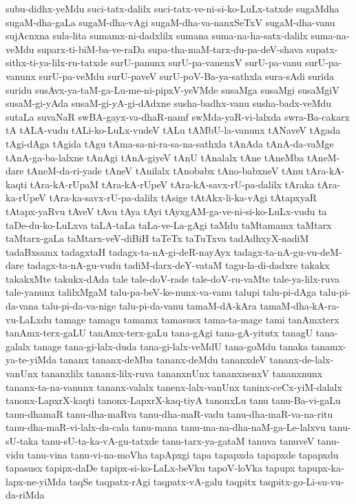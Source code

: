 {subu-didhx-yeMdu
suci-tatx-dalilx
suci-tatx-ve-ni-si-ko-LuLx-tatxde
sugaMdha
sugaM-dha-gaLa
sugaM-dha-vAgi
sugaM-dha-va-nanxSeTxV
sugaM-dha-vanu
sujAcnxna
sula-lita
sumamx-ni-dadxlilx
sumana
suma-na-ha-satx-dalilx
suma-na-veMdu
suparx-ti-biM-ba-ve-raDa
supa-tha-maM-tarx-du-pa-deV-shava
supatx-sithx-ti-ya-lilx-ru-tatxde
surU-panunx
surU-pa-vanenxV
surU-pa-vanu
surU-pa-vanunx
surU-pa-veMdu
surU-paveV
surU-poV-Ba-ya-sathxla
sura-sAdi
surida
suridu
susAvx-ya-taM-ga-Lu-me-ni-pipxV-yeVMde
susaMga
susaMgi
susaMgiV
susaM-gi-yAda
susaM-gi-yA-gi-dAdxne
susha-badhx-vanu
susha-badx-veMdu
sutaLa
suvaNaR
swBA-gayx-va-dhaR-namf
swMda-yaR-vi-lalxda
swra-Ba-cakarx
tA
tALA-vudu
tALi-ko-LuLx-vudeV
tALu
tAMbU-la-vanunx
tANaveV
tAgada
tAgi-dAga
tAgida
tAgu
tAma-sa-ni-ra-sa-na-sathxla
tAnAda
tAnA-da-vaMge
tAnA-ga-ba-lalxne
tAnAgi
tAnA-giyeV
tAnU
tAnalalx
tAne
tAneMba
tAneM-dare
tAneM-da-ri-yade
tAneV
tAnilalx
tAnobabx
tAno-babxneV
tAnu
tAra-kA-kaqti
tAra-kA-rUpaM
tAra-kA-rUpeV
tAra-kA-savx-rU-pa-dalilx
tAraka
tAra-ka-rUpeV
tAra-ka-savx-rU-pa-dalilx
tAsige
tAtAkx-li-ka-vAgi
tAtapxyaR
tAtapx-yaRvu
tAveV
tAvu
tAya
tAyi
tAyxgAM-ga-ve-ni-si-ko-LuLx-vudu
ta
taDe-du-ko-LuLxva
taLA-taLa
taLa-ve-La-gAgi
taMdu
taMtamamx
taMtarx
taMtarx-gaLa
taMtarx-veV-diBiH
taTeTx
taTuTxva
tadAdhxyX-nadiM
tadaBxsamx
tadagxtaH
tadagx-ta-nA-gi-deR-nayAyx
tadagx-ta-nA-gu-vu-deM-dare
tadagx-ta-nA-gu-vudu
tadiM-darx-deY-vataM
tagu-la-di-dadxre
takakx
takakxMte
takukx-dAda
tale
tale-doV-rade
tale-doV-ru-vaMte
tale-ya-lilx-ruva
tale-yanunx
talilxMgaM
talu-pa-beV-ke-nunx-va-vanu
talupi
talu-pi-dAga
talu-pi-da-vana
talu-pi-da-va-nige
talu-pi-da-vanu
tamaM-dA-kAra
tamaM-dha-kA-ra-vu-LaLxdu
tamage
tamagu
tamamx
tamasusx
tama-ta-mage
tami
tanAmxterx
tanAmx-terx-gaLU
tanAmx-terx-gaLu
tana-gAgi
tana-gA-yitutx
tanagU
tana-galalx
tanage
tana-gi-lalx-duda
tana-gi-lalx-veMdU
tana-goMdu
tanaka
tanamx-ya-te-yiMda
tananx
tananx-deMba
tananx-deMdu
tananxdeV
tananx-de-lalx-vanUnx
tananxlilx
tananx-lilx-ruva
tananxnUnx
tananxnenxV
tananxnunx
tananx-ta-na-vanunx
tananx-valalx
tanenx-lalx-vanUnx
taninx-ceCx-yiM-dalalx
tanonx-LapxrX-kaqti
tanonx-LapxrX-kaq-tiyA
tanonxLu
tanu
tanu-Ba-vi-gaLu
tanu-dhamaR
tanu-dha-maRva
tanu-dha-maR-vadu
tanu-dha-maR-va-na-ritu
tanu-dha-maR-vi-lalx-da-cala
tanu-mana
tanu-ma-na-dha-naM-ga-Le-lalxvu
tanu-sU-taka
tanu-sU-ta-ka-vA-gu-tatxde
tanu-tarx-ya-gataM
tanuva
tanuveV
tanu-vidu
tanu-vina
tanu-vi-na-moVha
tapApxgi
tapa
tapapxda
tapapxde
tapapxdu
tapasusx
tapipx-daDe
tapipx-si-ko-LaLx-beVku
tapoV-loVka
tapupx
tapupx-ka-lapx-ne-yiMda
taqSe
taqpatx-rAgi
taqpatx-vA-galu
taqpitx
taqpitx-go-Li-su-vu-da-riMda
}
